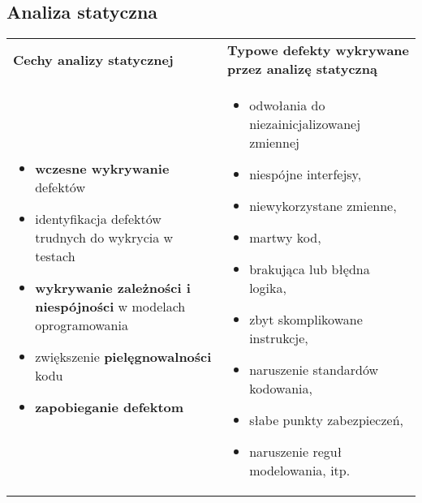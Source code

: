 \documentclass[../main.tex]{subfiles}
\begin{document}
    \subsection{Analiza statyczna}

    \begin{table}[H]
        \begin{center}
            \begin{tabular}{p{8cm} p{8cm}}
                \textbf{Cechy analizy statycznej} & \textbf{Typowe defekty wykrywane przez analizę statyczną} \\
                \begin{itemize}
                    \item \textbf{wczesne wykrywanie} defektów
                    \item identyfikacja defektów trudnych do wykrycia w testach
                    \item \textbf{wykrywanie zależności i niespójności} w modelach oprogramowania
                    \item zwiększenie \textbf{pielęgnowalności} kodu
                    \item \textbf{zapobieganie defektom}
                \end{itemize}
                &
                \begin{itemize}
                    \item odwołania do niezainicjalizowanej zmiennej
                    \item niespójne interfejsy,
                    \item niewykorzystane zmienne,
                    \item martwy kod,
                    \item brakująca lub błędna logika,
                    \item zbyt skomplikowane instrukcje,
                    \item naruszenie standardów kodowania,
                    \item słabe punkty zabezpieczeń,
                    \item naruszenie reguł modelowania, itp.
                \end{itemize} \\
            \end{tabular}
        \end{center}
    \end{table}
\end{document}
